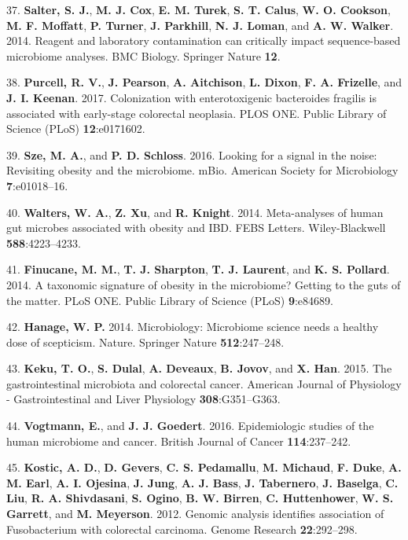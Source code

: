 \documentclass[12pt,]{article}
\begin{document}
\hypertarget{ref-Salter_contamination_2014}{}
37. \textbf{Salter, S. J.}, \textbf{M. J. Cox}, \textbf{E. M. Turek},
\textbf{S. T. Calus}, \textbf{W. O. Cookson}, \textbf{M. F. Moffatt},
\textbf{P. Turner}, \textbf{J. Parkhill}, \textbf{N. J. Loman}, and
\textbf{A. W. Walker}. 2014. Reagent and laboratory contamination can
critically impact sequence-based microbiome analyses. BMC Biology.
Springer Nature \textbf{12}.

\hypertarget{ref-Purcell2017}{}
38. \textbf{Purcell, R. V.}, \textbf{J. Pearson}, \textbf{A. Aitchison},
\textbf{L. Dixon}, \textbf{F. A. Frizelle}, and \textbf{J. I. Keenan}.
2017. Colonization with enterotoxigenic bacteroides fragilis is
associated with early-stage colorectal neoplasia. PLOS ONE. Public
Library of Science (PLoS) \textbf{12}:e0171602.

\hypertarget{ref-Sze2016}{}
39. \textbf{Sze, M. A.}, and \textbf{P. D. Schloss}. 2016. Looking for a
signal in the noise: Revisiting obesity and the microbiome. mBio.
American Society for Microbiology \textbf{7}:e01018--16.

\hypertarget{ref-Walters2014}{}
40. \textbf{Walters, W. A.}, \textbf{Z. Xu}, and \textbf{R. Knight}.
2014. Meta-analyses of human gut microbes associated with obesity and
IBD. FEBS Letters. Wiley-Blackwell \textbf{588}:4223--4233.

\hypertarget{ref-Finucane2014}{}
41. \textbf{Finucane, M. M.}, \textbf{T. J. Sharpton}, \textbf{T. J.
Laurent}, and \textbf{K. S. Pollard}. 2014. A taxonomic signature of
obesity in the microbiome? Getting to the guts of the matter. PLoS ONE.
Public Library of Science (PLoS) \textbf{9}:e84689.

\hypertarget{ref-Hanage2014}{}
42. \textbf{Hanage, W. P.} 2014. Microbiology: Microbiome science needs
a healthy dose of scepticism. Nature. Springer Nature
\textbf{512}:247--248.

\hypertarget{ref-keku_gastrointestinal_2015}{}
43. \textbf{Keku, T. O.}, \textbf{S. Dulal}, \textbf{A. Deveaux},
\textbf{B. Jovov}, and \textbf{X. Han}. 2015. The gastrointestinal
microbiota and colorectal cancer. American Journal of Physiology -
Gastrointestinal and Liver Physiology \textbf{308}:G351--G363.

\hypertarget{ref-vogtmann_epidemiologic_2016}{}
44. \textbf{Vogtmann, E.}, and \textbf{J. J. Goedert}. 2016.
Epidemiologic studies of the human microbiome and cancer. British
Journal of Cancer \textbf{114}:237--242.

\hypertarget{ref-kostic_genomic_2012}{}
45. \textbf{Kostic, A. D.}, \textbf{D. Gevers}, \textbf{C. S.
Pedamallu}, \textbf{M. Michaud}, \textbf{F. Duke}, \textbf{A. M. Earl},
\textbf{A. I. Ojesina}, \textbf{J. Jung}, \textbf{A. J. Bass},
\textbf{J. Tabernero}, \textbf{J. Baselga}, \textbf{C. Liu}, \textbf{R.
A. Shivdasani}, \textbf{S. Ogino}, \textbf{B. W. Birren}, \textbf{C.
Huttenhower}, \textbf{W. S. Garrett}, and \textbf{M. Meyerson}. 2012.
Genomic analysis identifies association of Fusobacterium with colorectal
carcinoma. Genome Research \textbf{22}:292--298.
\end{document}
